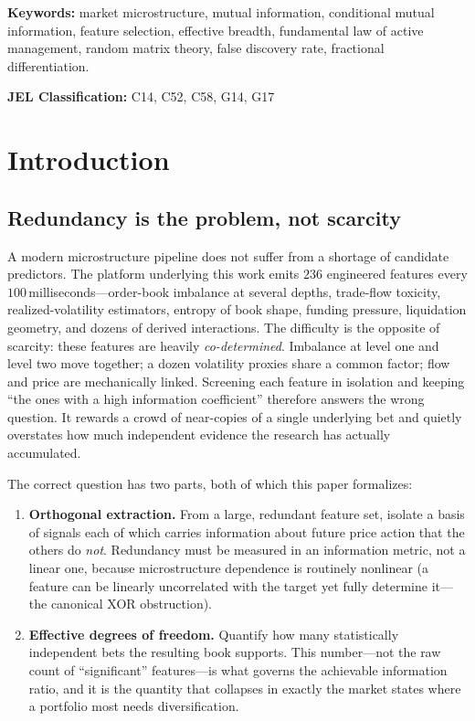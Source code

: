 \documentclass[11pt,a4paper]{article}
\theoremstyle{definition}
\theoremstyle{plain}
\begin{document}
\smallskip
\noindent\textbf{Keywords:} market microstructure, mutual information, conditional mutual
information, feature selection, effective breadth, fundamental law of active management, random
matrix theory, false discovery rate, fractional differentiation.

\smallskip
\noindent\textbf{JEL Classification:} C14, C52, C58, G14, G17

\tableofcontents
\bigskip

\section{Introduction}
\label{sec:intro}

\subsection{Redundancy is the problem, not scarcity}

A modern microstructure pipeline does not suffer from a shortage of candidate predictors. The
platform underlying this work emits $236$ engineered features every $100$\,milliseconds---order-book
imbalance at several depths, trade-flow toxicity, realized-volatility estimators, entropy of book
shape, funding pressure, liquidation geometry, and dozens of derived interactions. The difficulty
is the opposite of scarcity: these features are heavily \emph{co-determined}. Imbalance at level one
and level two move together; a dozen volatility proxies share a common factor; flow and price are
mechanically linked. Screening each feature in isolation and keeping ``the ones with a high
information coefficient'' therefore answers the wrong question. It rewards a crowd of near-copies of
a single underlying bet and quietly overstates how much independent evidence the research has
actually accumulated.

The correct question has two parts, both of which this paper formalizes:

\begin{enumerate}
  \item \textbf{Orthogonal extraction.} From a large, redundant feature set, isolate a basis of
        signals each of which carries information about future price action that the others do
        \emph{not}. Redundancy must be measured in an information metric, not a linear one, because
        microstructure dependence is routinely nonlinear (a feature can be linearly uncorrelated
        with the target yet fully determine it---the canonical XOR obstruction).
  \item \textbf{Effective degrees of freedom.} Quantify how many statistically independent bets the
        resulting book supports. This number---not the raw count of ``significant'' features---is
        what governs the achievable information ratio, and it is the quantity that collapses in
        exactly the market states where a portfolio most needs diversification.
\end{enumerate}
\end{document}
